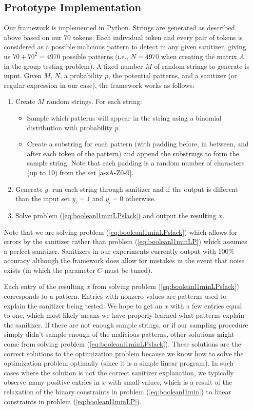 \subsection{Prototype Implementation}
Our framework is implemented in Python. Strings are generated as described above based on our 70 tokens. Each individual token and every pair of tokens is considered as a possible malicious pattern to detect in any given sanitizer, giving us $70+70^2=4970$ possible patterns (i.e., $N=4970$ when creating the matrix $A$ in the group testing problem). A fixed number $M$ of random strings to generate is input. Given $M$, $N$, a probability $p$, the potential patterns, and a sanitizer (or regular expression in our case), the framework works as follows:
\begin{enumerate}
	\item Create $M$ random strings. For each string:
		\begin{itemize}
			\item Sample which patterns will appear in the string using a binomial distribution with probability $p$.
			\item Create a substring for each pattern (with padding before, in between, and after each token of the pattern) and append the substrings to form the sample string. Note that each padding is a random number of characters (up to 10) from the set [a-zA-Z0-9].
		\end{itemize}
	\item Generate $y$: run each string through sanitizer and if the output is different than the input set $y_i=1$ and $y_i=0$ otherwise.
	\item Solve problem (\ref{eq:booleanl1minLPslack}) and output the resulting $x$.
\end{enumerate}
Note that we are solving problem (\ref{eq:booleanl1minLPslack}) which allows for errors by the sanitizer rather than problem (\ref{eq:booleanl1minLP}) which assumes a perfect sanitizer. Sanitizers in our experiments currently output with 100\% accuracy although the framework does allow for mistakes in the event that noise exists (in which the parameter $C$ must be tuned).

Each entry of the resulting $x$ from solving problem (\ref{eq:booleanl1minLPslack}) corresponds to a pattern.  Entries with nonzero values are patterns used to explain the sanitizer being tested. We hope to get an $x$ with a few entries equal to one, which most likely means we have properly learned what patterns explain the sanitizer. If there are not enough sample strings, or if our sampling procedure simply didn't sample enough of the malicious patterns, other solutions might come from solving problem (\ref{eq:booleanl1minLPslack}). These solutions are the correct solutions to the optimization problem because we know how to solve the optimization problem optimally (since it is a simple linear program). In such cases where the solution is not the correct sanitizer explanation, we typically observe many positive entries in $x$ with small values, which is a result of the relaxation of the binary constraints in problem (\ref{eq:booleanl1min}) to linear constraints in problem (\ref{eq:booleanl1minLP}).

